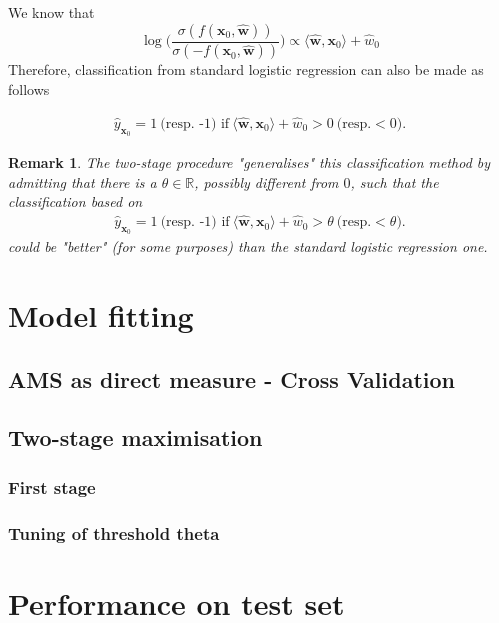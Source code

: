 \documentclass[]{article}
\newcommand{\w}{\mathbf{w}}
\newcommand{\x}{\mathbf{x}}
\newtheorem{remark}[theorem]{Remark}
\begin{document}
We know that $$\log \Big( \frac{\sigma(f(\x_0,\hat{\w}))}{\sigma(-f(\x_0,\hat{\w}))}\Big)\propto \langle\hat{\w},\x_0\rangle+\hat{w}_0$$
Therefore, classification from standard logistic regression can also be made as follows

\begin{align*}
\hat{y}_{\x_0}=1 \ \text{(resp. -1) if}\ \langle\hat{\w},\x_0\rangle+\hat{w}_0>0 \  \text{(resp.} <0).
\end{align*}

\begin{remark}
The two-stage procedure "generalises" this classification method by admitting that there is a $\theta\in \mathbb{R}$, possibly different from $0$, such that the classification based on 
\begin{align*}
\hat{y}_{\x_0}=1 \ \text{(resp. -1) if}\ \langle\hat{\w},\x_0\rangle+\hat{w}_0>\theta \  \text{(resp.} <\theta).
\end{align*}
could be "better" (for some purposes) than the standard logistic regression one. 
\end{remark}


\section{Model fitting}

\subsection{AMS as direct measure - Cross Validation}

\subsection{Two-stage maximisation}
\subsubsection{First stage}
\subsubsection{Tuning of threshold theta}

\section{Performance on test set}



\end{document}
